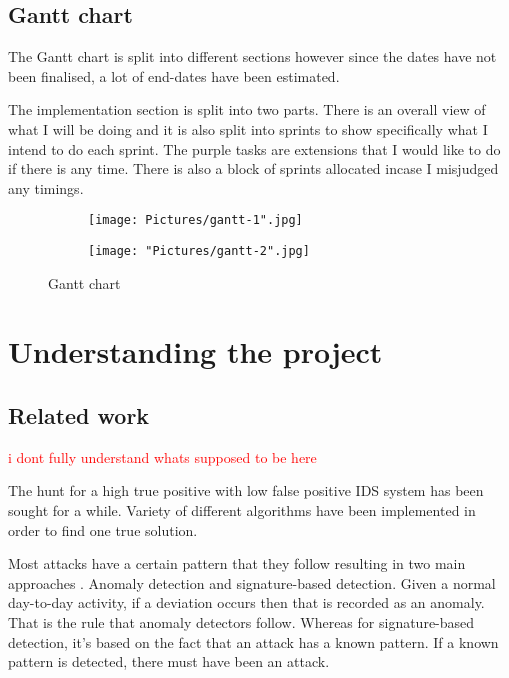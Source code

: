 \documentclass[11pt]{article}
\begin{document}
\subsection{Gantt chart}
The Gantt chart is split into different sections however since the dates have not been finalised, a lot of end-dates have been estimated. 

The implementation section is split into two parts. There is an overall view of what I will be doing and it is also split into sprints to show specifically what I intend to do each sprint. The purple tasks are extensions that I would like to do if there is any time. There is also a block of sprints allocated incase I misjudged any timings.

\begin{figure}[!p]
    \centering
    \begin{subfigure}{\linewidth}
      \texttt{[image: Pictures/gantt-1".jpg]}
    \end{subfigure}
    \begin{subfigure}{\linewidth}
      \texttt{[image: "Pictures/gantt-2".jpg]}
    \end{subfigure}
    \caption{Gantt chart}
    \label{fig:image10}
\end{figure}

\newpage
\section{Understanding the project}
\subsection{Related work}
\textcolor{red}{i dont fully understand whats supposed to be here}

The hunt for a high true positive with low false positive IDS system has been sought for a while. Variety of different algorithms have been implemented in order to find one true solution. 

Most attacks have a certain pattern that they follow resulting in two main approaches \cite{related-work-main-approaches}. Anomaly detection and signature-based detection. Given a normal day-to-day activity, if a deviation occurs then that is recorded as an anomaly. That is the rule that anomaly detectors follow. Whereas for signature-based detection, it’s based on the fact that an attack has a known pattern. If a known pattern is detected, there must have been an attack.
\end{document}
